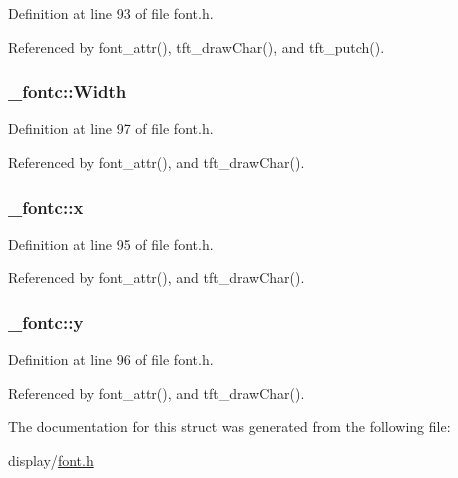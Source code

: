 Definition at line 93 of file font.\-h.



Referenced by font\-\_\-attr(), tft\-\_\-draw\-Char(), and tft\-\_\-putch().

\hypertarget{struct__fontc_ae3c802e1c35ae9a4e37c8eb2e9644325}{
\subsubsection[{Width}]{ \-\_\-fontc\-::\-Width}}\label{struct__fontc_ae3c802e1c35ae9a4e37c8eb2e9644325}


Definition at line 97 of file font.\-h.



Referenced by font\-\_\-attr(), and tft\-\_\-draw\-Char().

\hypertarget{struct__fontc_ad15d00ed46ebe52a085cf05b5ca5da90}{
\subsubsection[{x}]{ \-\_\-fontc\-::x}}\label{struct__fontc_ad15d00ed46ebe52a085cf05b5ca5da90}


Definition at line 95 of file font.\-h.



Referenced by font\-\_\-attr(), and tft\-\_\-draw\-Char().

\hypertarget{struct__fontc_aebbde0dc41068722ee1a69f4a56478a4}{
\subsubsection[{y}]{ \-\_\-fontc\-::y}}\label{struct__fontc_aebbde0dc41068722ee1a69f4a56478a4}


Definition at line 96 of file font.\-h.



Referenced by font\-\_\-attr(), and tft\-\_\-draw\-Char().



The documentation for this struct was generated from the following file\-:\begin{DoxyCompactItemize}
\item 
display/\hyperlink{display_2font_8h}{font.\-h}\end{DoxyCompactItemize}
